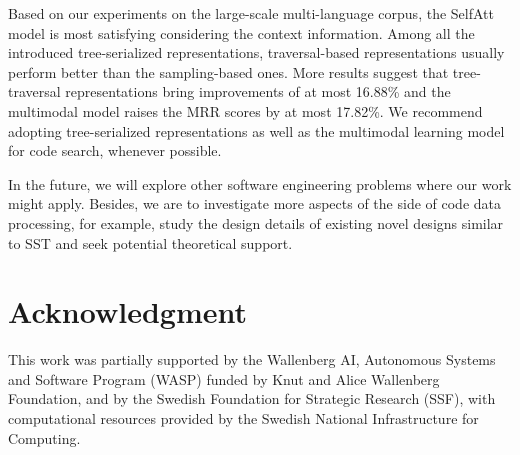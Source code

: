 \documentclass[conference]{IEEEtran}
\begin{document}
Based on our experiments on the large-scale multi-language corpus, the SelfAtt model is most satisfying considering the context information. Among all the introduced tree-serialized representations, traversal-based representations usually perform better than the sampling-based ones. More results suggest that tree-traversal representations bring improvements of at most 16.88\% and the multimodal model raises the MRR scores by at most 17.82\%. We recommend adopting tree-serialized representations as well as the multimodal learning model for code search, whenever possible.

In the future, we will explore other software engineering problems where our work might apply. Besides, we are to investigate more aspects of the side of code data processing, for example, study the design details of existing novel designs similar to SST and seek potential theoretical support.



 
\section*{Acknowledgment}

This work was partially supported by the Wallenberg AI, Autonomous Systems and Software Program (WASP) funded by Knut and Alice Wallenberg Foundation, and by the Swedish Foundation for Strategic Research (SSF), with computational resources provided by the Swedish National Infrastructure for Computing.

\newpage

\printbibliography[heading=bibintoc]
\end{document}
